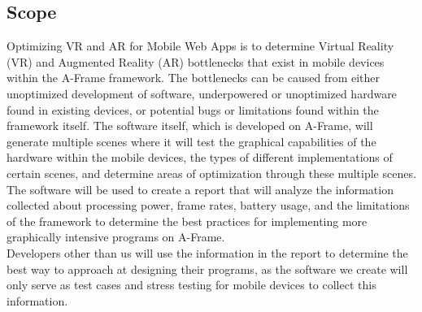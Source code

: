 \documentclass[letterpaper,10pt,draftclsnofoot,onecolumn,compsoc]{IEEEtran}
\begin{document}
\subsection{Scope}
\begin{singlespace}
\noindent
Optimizing VR and AR for Mobile Web Apps is to determine Virtual Reality (VR) and Augmented Reality (AR) bottlenecks that exist in mobile devices within the A-Frame framework. The bottlenecks can be caused from either unoptimized development of software, underpowered or unoptimized hardware found in existing devices, or potential bugs or limitations found within the framework itself. The software itself, which is developed on A-Frame, will generate multiple scenes where it will test the graphical capabilities of the hardware within the mobile devices, the types of different implementations of certain scenes, and determine areas of optimization through these multiple scenes. The software will be used to create a report that will analyze the information collected about processing power, frame rates, battery usage, and the limitations of the framework to determine the best practices for implementing more graphically intensive programs on A-Frame. \\

\noindent
Developers other than us will use the information in the report to determine the best way to approach at designing their programs, as the software we create will only serve as test cases and stress testing for mobile devices to collect this information. 
\end{singlespace}
\end{document}
